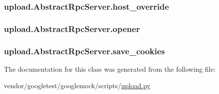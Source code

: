 \subsubsection[{\texorpdfstring{host\+\_\+override}{host_override}}]{\setlength{\rightskip}{0pt plus 5cm}upload.\+Abstract\+Rpc\+Server.\+host\+\_\+override}\hypertarget{classupload_1_1AbstractRpcServer_a783a4a7e4ffb776a57a3f267300a213b}{}\label{classupload_1_1AbstractRpcServer_a783a4a7e4ffb776a57a3f267300a213b}
\subsubsection[{\texorpdfstring{opener}{opener}}]{\setlength{\rightskip}{0pt plus 5cm}upload.\+Abstract\+Rpc\+Server.\+opener}\hypertarget{classupload_1_1AbstractRpcServer_aa931446476e0e86f3ade7fef0a0aea5a}{}\label{classupload_1_1AbstractRpcServer_aa931446476e0e86f3ade7fef0a0aea5a}
\subsubsection[{\texorpdfstring{save\+\_\+cookies}{save_cookies}}]{\setlength{\rightskip}{0pt plus 5cm}upload.\+Abstract\+Rpc\+Server.\+save\+\_\+cookies}\hypertarget{classupload_1_1AbstractRpcServer_affe342205c4647d41b127f5a5634858b}{}\label{classupload_1_1AbstractRpcServer_affe342205c4647d41b127f5a5634858b}


The documentation for this class was generated from the following file\+:\begin{DoxyCompactItemize}
\item 
vendor/googletest/googlemock/scripts/\hyperlink{googlemock_2scripts_2upload_8py}{upload.\+py}\end{DoxyCompactItemize}
